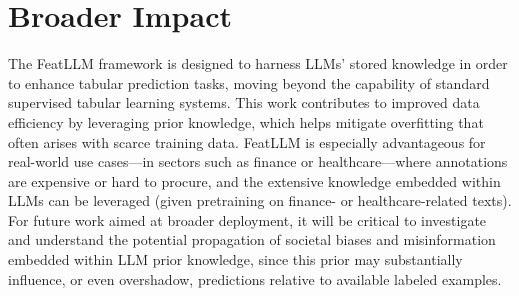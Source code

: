 \section{Broader Impact} The \textsf{FeatLLM} framework is designed to harness LLMs’ stored knowledge in order to enhance tabular prediction tasks, moving beyond the capability of standard supervised tabular learning systems. This work contributes to improved data efficiency by leveraging prior knowledge, which helps mitigate overfitting that often arises with scarce training data. \textsf{FeatLLM} is especially advantageous for real-world use cases—in sectors such as finance or healthcare—where annotations are expensive or hard to procure, and the extensive knowledge embedded within LLMs can be leveraged (given pretraining on finance- or healthcare-related texts). For future work aimed at broader deployment, it will be critical to investigate and understand the potential propagation of societal biases and misinformation embedded within LLM prior knowledge, since this prior may substantially influence, or even overshadow, predictions relative to available labeled examples.

